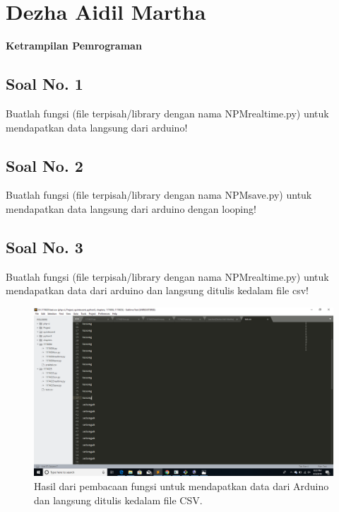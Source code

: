 \section{Dezha Aidil Martha}
{\Large \textbf{Ketrampilan Pemrograman}}
\subsection{Soal No. 1}
Buatlah  fungsi  (file  terpisah/library  dengan  nama  NPMrealtime.py)  untuk mendapatkan data langsung dari arduino!



\subsection{Soal No. 2}
Buatlah fungsi (file terpisah/library dengan nama NPMsave.py) untuk mendapatkan data langsung dari arduino dengan looping!


\subsection{Soal No. 3}
Buatlah  fungsi  (file  terpisah/library  dengan  nama  NPMrealtime.py) untuk mendapatkan data dari arduino dan langsung ditulis kedalam file csv!


\begin{figure}[H]
	\includegraphics[scale=0.2]{figures/5/Praktek/1174025/csv.png}
	\centering
	\caption{Hasil dari pembacaan fungsi untuk mendapatkan data dari Arduino dan langsung ditulis kedalam file CSV.}
\end{figure}


